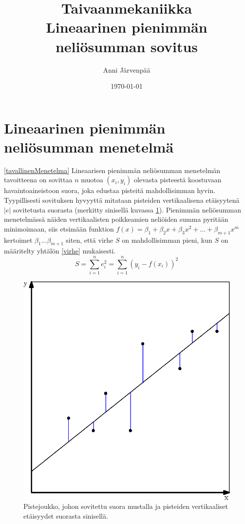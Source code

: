 \documentclass[12pt,a4paper,titlepage]{article}
\title{Taivaanmekaniikka \\ Lineaarinen pienimmän neliösumman sovitus \vspace{0.5em}}
\author{\begin{tabular}{c}
Anni Järvenpää
\end{tabular}}
\date{\today}
\begin{document}
\maketitle

\newpage
\null
\thispagestyle{empty}
\addtocounter{page}{-1}
\newpage

\section{Lineaarinen pienimmän neliösumman menetelmä} \ref{tavallinenMenetelma}
Lineaarisen pienimmän neliösumman menetelmän tavoitteena on sovittaa $n$ muotoa $(x_i, y_i)$ olevasta pisteestä koostuvaan havaintoaineistoon suora, joka edustaa pisteitä mahdollisimman hyvin. Tyypillisesti sovituksen hyvyyttä mitataan pisteiden vertikaalisena etäi\-syytenä~$|e|$ sovitetusta suorasta (merkitty sinisellä kuvassa \ref{vertikaalietaisyys}). Pienimmän neliösumman menetelmässä näiden vertikaalisten poikkeamien neliöiden summa pyritään minimoimaan, siis etsimään funktion $f(x) = \beta_1 + \beta_2 x + \beta_3 x^2 + ... + \beta_{m+1} x^m$ kertoimet $\beta_1 ... \beta_{m+1}$ siten, että virhe $S$ on mahdollisimman pieni, kun $S$ on määritelty yhtälön \ref{virhe} mukaisesti.~\cite{basicideas}
\begin{equation} \label{virhe}
	S = \sum\limits_{i=1}^{n} e_i^2 = \sum\limits_{i=1}^{n} (y_i - f(x_i))^2
\end{equation}

\begin{figure}
\centering
\includegraphics{vertikaalietaisyys.eps}
\caption{Pistejoukko, johon sovitettu suora mustalla ja pisteiden vertikaaliset etäisyydet suorasta sinisellä.}
\label{vertikaalietaisyys}
\end{figure}
\end{document}
